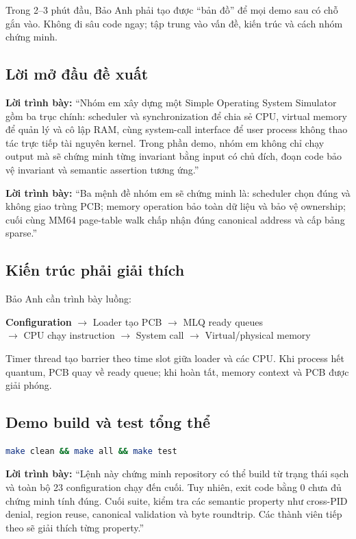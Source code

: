 \documentclass[12pt,a4paper]{article}
\newcommand{\code}[1]{\texttt{\detokenize{#1}}}
\newcommand{\say}[1]{\textbf{\color{bkblue}Lời trình bày:} ``#1''}
\begin{document}
Trong 2--3 phút đầu, Bảo Anh phải tạo được ``bản đồ'' để mọi demo sau có chỗ
gắn vào. Không đi sâu code ngay; tập trung vào vấn đề, kiến trúc và cách nhóm
chứng minh.

\subsection{Lời mở đầu đề xuất}

\say{Nhóm em xây dựng một Simple Operating System Simulator gồm ba trục chính:
scheduler và synchronization để chia sẻ CPU, virtual memory để quản lý và cô
lập RAM, cùng system-call interface để user process không thao tác trực tiếp
tài nguyên kernel. Trong phần demo, nhóm em không chỉ chạy output mà sẽ chứng
minh từng invariant bằng input có chủ đích, đoạn code bảo vệ invariant và
semantic assertion tương ứng.}

\say{Ba mệnh đề nhóm em sẽ chứng minh là: scheduler chọn đúng và không giao
trùng PCB; memory operation bảo toàn dữ liệu và bảo vệ ownership; cuối cùng
MM64 page-table walk chấp nhận đúng canonical address và cấp bảng sparse.}

\subsection{Kiến trúc phải giải thích}

Bảo Anh cần trình bày luồng:

\begin{center}
\textbf{Configuration} \(\rightarrow\) Loader tạo PCB
\(\rightarrow\) MLQ ready queues\\[2mm]
\(\rightarrow\) CPU chạy instruction
\(\rightarrow\) System call
\(\rightarrow\) Virtual/physical memory
\end{center}

Timer thread tạo barrier theo time slot giữa loader và các CPU. Khi process
hết quantum, PCB quay về ready queue; khi hoàn tất, memory context và PCB được
giải phóng.

\subsection{Demo build và test tổng thể}

\begin{lstlisting}[language=bash]
make clean && make all && make test
\end{lstlisting}

\say{Lệnh này chứng minh repository có thể build từ trạng thái sạch và toàn bộ
23 configuration chạy đến cuối. Tuy nhiên, exit code bằng 0 chưa đủ chứng minh
tính đúng. Cuối suite, \code{tests/assert_outputs.sh} kiểm tra các semantic
property như cross-PID denial, region reuse, canonical validation và byte
roundtrip. Các thành viên tiếp theo sẽ giải thích từng property.}
\end{document}
